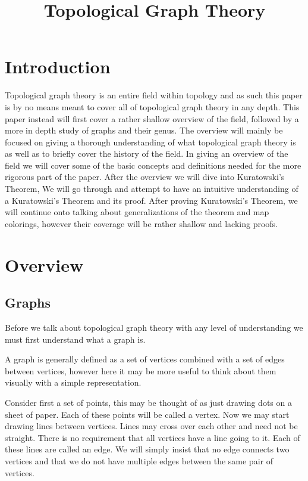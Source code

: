 \documentclass{article}
\title{Topological Graph Theory}
\begin{document}
\maketitle
\tableofcontents



\section{Introduction}
Topological graph theory is an entire field within topology and as such this paper is by no means meant to cover all of topological graph theory in any depth. This paper instead will first cover a rather shallow overview of the field, followed by a more in depth study of graphs and their genus. The overview will mainly be focused on giving a thorough understanding of what topological graph theory is as well as to briefly cover the history of the field. In giving an overview of the field we will cover some of the basic concepts and definitions needed for the more rigorous part of the paper. After the overview we will dive into Kuratowski's Theorem, We will go through and attempt to have an intuitive understanding of a Kuratowski's Theorem and its proof. After proving Kuratowski's Theorem, we will continue onto talking about generalizations of the theorem and map colorings, however their coverage will be rather shallow and lacking proofs.

\section{Overview}
\subsection{Graphs}
Before we talk about topological graph theory with any level of understanding we must first understand what a graph is.

A graph is generally defined as a set of vertices combined with a set of edges between vertices, however here it may be more useful to think about them visually with a simple representation.

Consider first a set of points, this may be thought of as just drawing dots on a sheet of paper. Each of these points will be called a vertex. Now we may start drawing lines between vertices. Lines may cross over each other and need not be straight. There is no requirement that all vertices have a line going to it. Each of these lines are called an edge. We will simply insist that no edge connects two vertices and that we do not have multiple edges between the same pair of vertices.
\end{document}
